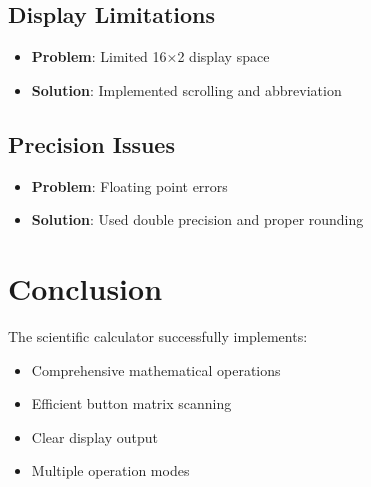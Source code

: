 \documentclass{article}
\begin{document}
\subsection{Display Limitations}
\begin{itemize}
    \item \textbf{Problem}: Limited 16×2 display space
    \item \textbf{Solution}: Implemented scrolling and abbreviation
\end{itemize}

\subsection{Precision Issues}
\begin{itemize}
    \item \textbf{Problem}: Floating point errors
    \item \textbf{Solution}: Used double precision and proper rounding
\end{itemize}

\section{Conclusion}
The scientific calculator successfully implements:
\begin{itemize}
    \item Comprehensive mathematical operations
    \item Efficient button matrix scanning
    \item Clear display output
    \item Multiple operation modes
\end{itemize}
\end{document}
